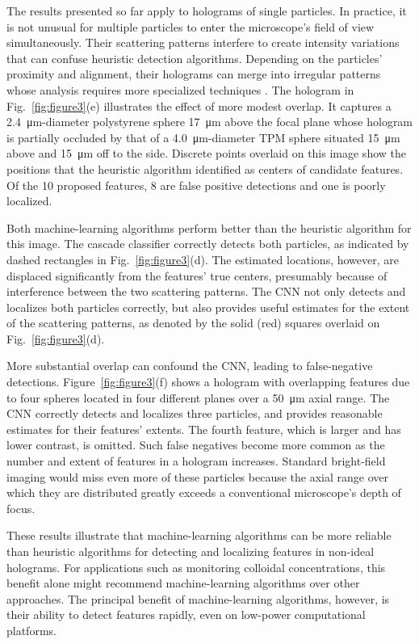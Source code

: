 The results presented so far apply to holograms of single
particles.
In practice, it is not unusual for multiple particles to enter 
the microscope's field of view simultaneously.
Their scattering patterns interfere to create
intensity variations that can confuse heuristic detection algorithms.
Depending on the particles' proximity and alignment, their
holograms can merge into irregular patterns whose analysis
requires more specialized techniques \cite{perry12,fung13}.
The hologram in Fig.~\ref{fig:figure3}(e)
illustrates the effect of more modest overlap.
It captures a \SI{2.4}{\um}-diameter
polystyrene sphere \SI{17}{\um} above the focal plane
whose hologram is partially occluded by that 
of a \SI{4.0}{\um}-diameter TPM sphere situated \SI{15}{\um}
above and \SI{15}{\um} off to the side.
Discrete points overlaid on this image show the
positions that the heuristic algorithm
identified as centers of candidate features.
Of the 10 proposed features, 8 are false positive detections
and one is poorly localized.

Both machine-learning algorithms perform better than the
heuristic algorithm for this image.
The cascade classifier correctly
detects both particles, as indicated by dashed rectangles
in Fig.~\ref{fig:figure3}(d).
The estimated locations, however, are displaced significantly
from the features' true centers, presumably because of
interference between the two scattering patterns.
The CNN not only detects and localizes
both particles correctly, but also provides useful estimates for the
extent of the scattering patterns, as denoted by the solid (red)
squares overlaid on Fig.~\ref{fig:figure3}(d).

More substantial overlap can confound the CNN,
leading to false-negative detections.
Figure~\ref{fig:figure3}(f) shows a hologram with
overlapping features due to four spheres
located in four different planes over a \SI{50}{\um} axial
range.
The CNN correctly detects and
localizes three particles, and provides reasonable
estimates for their features' extents.
The fourth feature, which is larger and has lower contrast,
is omitted.
Such false negatives become more common as the number and
extent of features in a hologram increases.
Standard bright-field imaging would miss even
more of these particles because the axial range
over which they are distributed greatly exceeds
a conventional microscope's depth of focus.

These results illustrate that machine-learning algorithms can
be more reliable than heuristic algorithms for detecting and
localizing features in non-ideal holograms.
For applications such as monitoring colloidal concentrations, this
benefit alone might recommend machine-learning algorithms
over other approaches.
The principal benefit of machine-learning algorithms, however,
is their ability to detect features rapidly, even on
low-power computational platforms.

